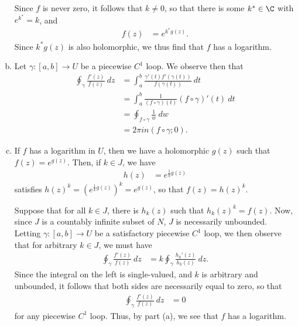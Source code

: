 \documentclass[10pt]{mypackage}
\begin{document}
\begin{solution}
\begin{enumerate}[(a)]
      Since $f$ is never zero, it follows that $k\neq 0$, so that there is some $k^{\ast}\in \C$ with $e^{k^{\ast}} = k$, and
      \begin{align*}
        f(z) &= e^{k^{\ast}g(z)}.
      \end{align*}
      Since $k^{\ast}g(z)$ is also holomorphic, we thus find that $f$ has a logarithm.
    \item Let $\gamma\colon [a,b]\rightarrow U$ be a piecewise $C^{1}$ loop. We observe then that
      \begin{align*}
        \oint_{\gamma}^{} \frac{f'(z)}{f(z)}\:dz &= \int_{a}^{b} \frac{\gamma'(t)f'\left( \gamma(t) \right)}{f\left(\gamma(t)\right)}\:dt\\
                                                 &= \int_{a}^{b} \frac{1}{\left( f\circ\gamma \right)(t)}\left( f\circ\gamma \right)'(t)\:dt\\
                                                 &= \oint_{f\circ\gamma}^{} \frac{1}{w}\:dw\\
                                                 &= 2\pi i n\left( f\circ\gamma;0 \right).
      \end{align*}
    \item If $f$ has a logarithm in $U$, then we have a holomorphic $g(z)$ such that $f(z) = e^{g(z)}$. Then, if $k\in J$, we have
      \begin{align*}
        h(z) &= e^{\frac{1}{k}g(z)}
      \end{align*}
      satisfies $h(z)^{k} = \left( e^{\frac{1}{k}g(z)} \right)^{k} = e^{g(z)}$, so that $f(z) = h(z)^{k}$.\newline

      Suppose that for all $k\in J$, there is $h_k(z)$ such that $h_k(z)^{k} = f(z)$. Now, since $J$ is a countably infinite subset of $N$, $J$ is necessarily unbounded. Letting $\gamma\colon [a,b]\rightarrow U$ be a satisfactory piecewise $C^{1}$ loop, we then observe that for arbitrary $k\in J$, we must have
      \begin{align*}
        \oint_{\gamma}^{} \frac{f'(z)}{f(z)}\:dz &= k \oint_{\gamma}^{} \frac{h_k'(z)}{h_k(z)}\:dz.
      \end{align*}
      Since the integral on the left is single-valued, and $k$ is arbitrary and unbounded, it follows that both sides are necessarily equal to zero, so that
      \begin{align*}
        \oint_{\gamma}^{} \frac{f'(z)}{f(z)}\:dz &= 0
      \end{align*}
      for any piecewise $C^{1}$ loop. Thus, by part (a), we see that $f$ has a logarithm.
  \end{enumerate}
\end{solution}
\end{document}
